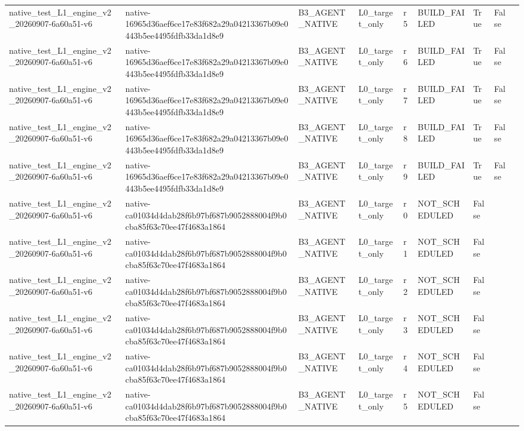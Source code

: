 \begin{tabular}{lllllllll}
native\_test\_L1\_engine\_v2\_20260907-6a60a51-v6 & native-16965d36aef6ce17e83f682a29a04213367b09e0443b5ee4495fdfb33da1d8e9 & B3\_AGENT\_NATIVE & L0\_target\_only & r5 & BUILD\_FAILED & True & False &  \\
native\_test\_L1\_engine\_v2\_20260907-6a60a51-v6 & native-16965d36aef6ce17e83f682a29a04213367b09e0443b5ee4495fdfb33da1d8e9 & B3\_AGENT\_NATIVE & L0\_target\_only & r6 & BUILD\_FAILED & True & False &  \\
native\_test\_L1\_engine\_v2\_20260907-6a60a51-v6 & native-16965d36aef6ce17e83f682a29a04213367b09e0443b5ee4495fdfb33da1d8e9 & B3\_AGENT\_NATIVE & L0\_target\_only & r7 & BUILD\_FAILED & True & False &  \\
native\_test\_L1\_engine\_v2\_20260907-6a60a51-v6 & native-16965d36aef6ce17e83f682a29a04213367b09e0443b5ee4495fdfb33da1d8e9 & B3\_AGENT\_NATIVE & L0\_target\_only & r8 & BUILD\_FAILED & True & False &  \\
native\_test\_L1\_engine\_v2\_20260907-6a60a51-v6 & native-16965d36aef6ce17e83f682a29a04213367b09e0443b5ee4495fdfb33da1d8e9 & B3\_AGENT\_NATIVE & L0\_target\_only & r9 & BUILD\_FAILED & True & False &  \\
native\_test\_L1\_engine\_v2\_20260907-6a60a51-v6 & native-ca01034d4dab28f6b97bf687b9052888004f9b0cba85f63c70ee47f4683a1864 & B3\_AGENT\_NATIVE & L0\_target\_only & r0 & NOT\_SCHEDULED & False &  &  \\
native\_test\_L1\_engine\_v2\_20260907-6a60a51-v6 & native-ca01034d4dab28f6b97bf687b9052888004f9b0cba85f63c70ee47f4683a1864 & B3\_AGENT\_NATIVE & L0\_target\_only & r1 & NOT\_SCHEDULED & False &  &  \\
native\_test\_L1\_engine\_v2\_20260907-6a60a51-v6 & native-ca01034d4dab28f6b97bf687b9052888004f9b0cba85f63c70ee47f4683a1864 & B3\_AGENT\_NATIVE & L0\_target\_only & r2 & NOT\_SCHEDULED & False &  &  \\
native\_test\_L1\_engine\_v2\_20260907-6a60a51-v6 & native-ca01034d4dab28f6b97bf687b9052888004f9b0cba85f63c70ee47f4683a1864 & B3\_AGENT\_NATIVE & L0\_target\_only & r3 & NOT\_SCHEDULED & False &  &  \\
native\_test\_L1\_engine\_v2\_20260907-6a60a51-v6 & native-ca01034d4dab28f6b97bf687b9052888004f9b0cba85f63c70ee47f4683a1864 & B3\_AGENT\_NATIVE & L0\_target\_only & r4 & NOT\_SCHEDULED & False &  &  \\
native\_test\_L1\_engine\_v2\_20260907-6a60a51-v6 & native-ca01034d4dab28f6b97bf687b9052888004f9b0cba85f63c70ee47f4683a1864 & B3\_AGENT\_NATIVE & L0\_target\_only & r5 & NOT\_SCHEDULED & False &  &  \\

\end{tabular}
